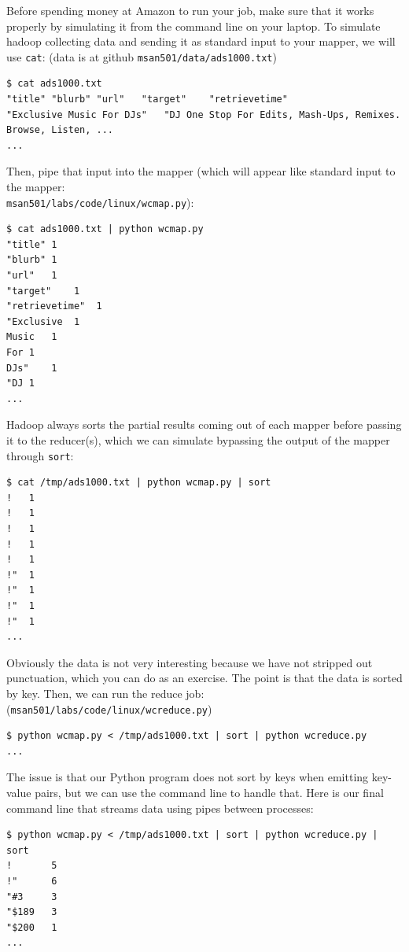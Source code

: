 \begin{fullwidth}
Before spending money at Amazon to run your job, make sure that it works properly by simulating it from the command line on your laptop. To simulate hadoop collecting data and sending it as standard input to your mapper, we will use {\tt cat}: (data is at github {\tt msan501/data/ads1000.txt})

\begin{lstlisting}[style=BashInputStyle]
$ cat ads1000.txt
"title"	"blurb"	"url"	"target"	"retrievetime"
"Exclusive Music For DJs"	"DJ One Stop For Edits, Mash-Ups, Remixes. Browse, Listen, ...
...
\end{lstlisting}

 Then, pipe that input into the mapper (which will appear like standard input to the mapper:\\
 {\tt msan501/labs/code/linux/wcmap.py}):

\begin{lstlisting}[style=BashInputStyle]
$ cat ads1000.txt | python wcmap.py
"title"	1
"blurb"	1
"url"	1
"target"	1
"retrievetime"	1
"Exclusive	1
Music	1
For	1
DJs"	1
"DJ	1
...
\end{lstlisting}

\noindent Hadoop always sorts the partial results coming out of each mapper before passing it to the reducer(s), which we can simulate bypassing the output of the mapper through {\tt sort}:

\begin{lstlisting}[style=BashInputStyle]
$ cat /tmp/ads1000.txt | python wcmap.py | sort
!	1
!	1
!	1
!	1
!	1
!"	1
!"	1
!"	1
!"	1
...
\end{lstlisting}

\noindent Obviously the data is not very interesting because we have not stripped out punctuation, which you can do as an exercise.  The point is that the data is sorted by key. Then, we can run the reduce job:\\
({\tt msan501/labs/code/linux/wcreduce.py})

\begin{lstlisting}[style=BashInputStyle]
$ python wcmap.py < /tmp/ads1000.txt | sort | python wcreduce.py
...
\end{lstlisting}

\noindent The issue is that our Python program does not sort by keys when emitting key-value pairs, but we can use the command line to handle that. Here is our final command line that streams data using pipes between processes:

\begin{lstlisting}[style=BashInputStyle]
$ python wcmap.py < /tmp/ads1000.txt | sort | python wcreduce.py | sort
!       5
!"      6
"#3     3
"$189   3
"$200   1
...
\end{lstlisting}


\end{fullwidth}
